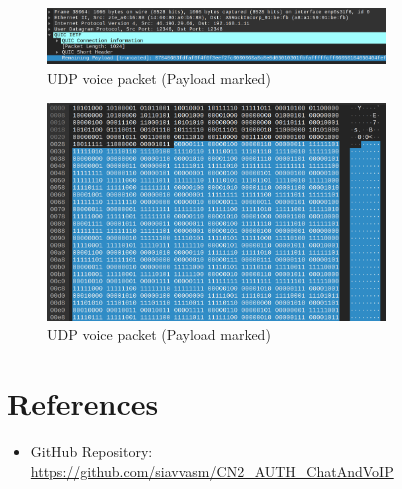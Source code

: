 \documentclass{article}
\begin{document}
\begin{figure}[h]
    \centering
    \includegraphics[width=0.8\textwidth]{udp-voice-2.png}
    \caption{UDP voice packet (Payload marked)}
    \label{fig:udp-voice-2}
\end{figure}

\begin{figure}[h]
    \centering
    \includegraphics[width=0.8\textwidth]{udp-voice-3.png}
    \caption{UDP voice packet (Payload marked)}
    \label{fig:udp-voice-3}
\end{figure}


\section{References}
\begin{itemize}
    \item GitHub Repository: \url{https://github.com/siavvasm/CN2_AUTH_ChatAndVoIP}
\end{itemize}
\end{document}

